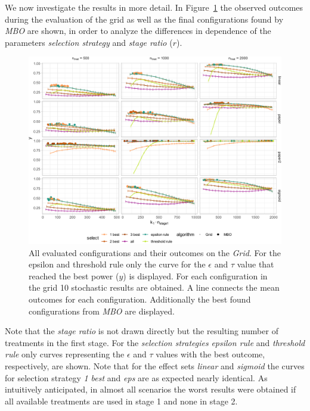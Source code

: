 \documentclass[bimj,fleqn]{w-art}
\theoremstyle{plain}
\theoremstyle{definition}
\begin{document}
We now investigate the results in more detail.
In Figure~\ref{fig:plot_allbest} the observed outcomes during the evaluation of the grid as well as the final configurations found by \emph{MBO} are shown, in order to analyze the differences in dependence of the parameters \emph{selection strategy} and \emph{stage ratio} ($r$).
\begin{figure}[htb]
\centering
\includegraphics[width=\linewidth]{generated/figures/plot_allbest.pdf}
\caption{%
  All evaluated configurations and their outcomes on the \emph{Grid}.
  For the epsilon and threshold rule only the curve for the $\epsilon$ and $\tau$ value that reached the best power ($y$) is displayed.
  For each configuration in the grid 10 stochastic results are obtained.
  A line connects the mean outcomes for each configuration.
  Additionally the best found configurations from \emph{MBO} are displayed.
  }
\label{fig:plot_allbest}
\end{figure}
Note that the \emph{stage ratio} is not drawn directly but the resulting number of treatments in the first stage.
For the \emph{selection strategies} \emph{epsilon rule} and \emph{threshold rule} only curves representing the $\epsilon$ and $\tau$ values with the best outcome, respectively, are shown.
Note that for the effect sets \emph{linear} and \emph{sigmoid} the curves for selection strategy \emph{1 best} and \emph{eps} are as expected nearly identical.
As intuitively anticipated, in almost all scenarios the worst results were obtained if all available treatments are used in stage 1 and none in stage 2. 
\end{document}

